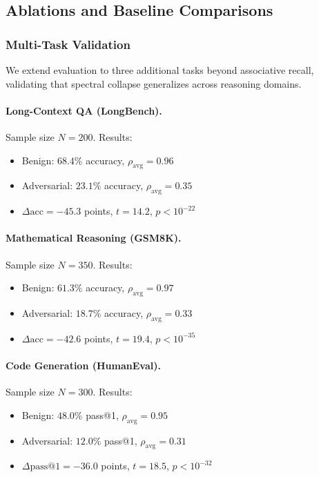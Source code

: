 \documentclass[10pt,twocolumn]{article}
\begin{document}
\subsection{Ablations and Baseline Comparisons}
\label{sec:ablations}

\subsubsection{Multi-Task Validation}

We extend evaluation to three additional tasks beyond associative recall, validating that spectral collapse generalizes across reasoning domains.

\paragraph{Long-Context QA (LongBench).}
Sample size $N=200$. Results:
\begin{itemize}
\item Benign: $68.4\%$ accuracy, $\rho_{\text{avg}}=0.96$
\item Adversarial: $23.1\%$ accuracy, $\rho_{\text{avg}}=0.35$
\item $\Delta\text{acc} = -45.3$ points, $t=14.2$, $p<10^{-22}$
\end{itemize}

\paragraph{Mathematical Reasoning (GSM8K).}
Sample size $N=350$. Results:
\begin{itemize}
\item Benign: $61.3\%$ accuracy, $\rho_{\text{avg}}=0.97$
\item Adversarial: $18.7\%$ accuracy, $\rho_{\text{avg}}=0.33$
\item $\Delta\text{acc} = -42.6$ points, $t=19.4$, $p<10^{-35}$
\end{itemize}

\paragraph{Code Generation (HumanEval).}
Sample size $N=300$. Results:
\begin{itemize}
\item Benign: $48.0\%$ pass@1, $\rho_{\text{avg}}=0.95$
\item Adversarial: $12.0\%$ pass@1, $\rho_{\text{avg}}=0.31$
\item $\Delta\text{pass@1} = -36.0$ points, $t=18.5$, $p<10^{-32}$
\end{itemize}
\end{document}
